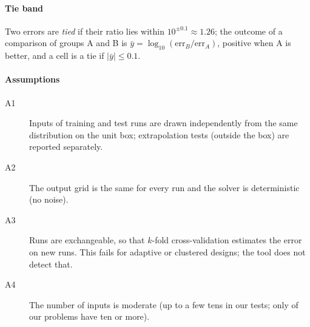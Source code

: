 \paragraph{Tie band} Two errors are \emph{tied} if their ratio lies within $10^{\pm0.1}\approx1.26$; the outcome of a comparison of groups A and B is $\bar y=\log_{10}(\mathrm{err}_B/\mathrm{err}_A)$, positive when A is better, and a cell is a tie if $|\bar y|\le0.1$.
\paragraph{Assumptions}
\begin{description}
\item[A1] Inputs of training and test runs are drawn independently from the same distribution on the unit box; extrapolation tests (outside the box) are reported separately.
\item[A2] The output grid is the same for every run and the solver is deterministic (no noise).
\item[A3] Runs are exchangeable, so that $k$-fold cross-validation estimates the error on new runs. This fails for adaptive or clustered designs; the tool does not detect that.
\item[A4] The number of inputs is moderate (up to a few tens in our tests; only \NHighP{} of our \NAllProblems{} problems have ten or more).
\end{description}
